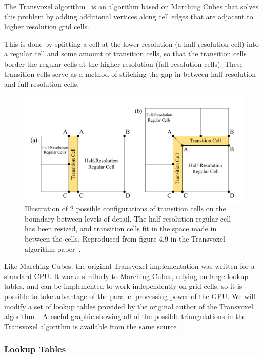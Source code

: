 \documentclass[11pt]{article}
\begin{document}
The Transvoxel algorithm~\cite{lengyel_2010} is an algorithm based on Marching Cubes that solves this problem by adding additional vertices along cell edges that are adjacent to higher resolution grid cells.

This is done by splitting a cell at the lower resolution (a half-resolution cell) into a regular cell and some amount of transition cells, so that the transition cells border the regular cells at the higher resolution (full-resolution cells). These transition cells serve as a method of stitching the gap in between half-resolution and full-resolution cells.
\begin{figure}[H]
  \includegraphics[width=\textwidth]{transition_cells}
  \caption{Illustration of 2 possible configurations of transition cells on the boundary between levels of detail. The half-resolution regular cell has been resized, and transition cells fit in the space made in between the cells. Reproduced from figure 4.9 in the Transvoxel algorithm paper~\cite{lengyel_2010}.}
  \label{fig:transition_cells}
\end{figure}

Like Marching Cubes, the original Transvoxel implementation was written for a standard CPU. It works similarly to Marching Cubes, relying on large lookup tables, and can be implemented to work independently on grid cells, so it is possible to take advantage of the parallel processing power of the GPU. We will modify a set of lookup tables provided by the original author of the Transvoxel algorithm~\cite{lengyel_2009}. A useful graphic showing all of the possible triangulations in the Transvoxel algorithm is available from the same source~\cite{lengyel}.

\subsubsection{Lookup Tables}
\label{section:lookup_tables}
\end{document}
